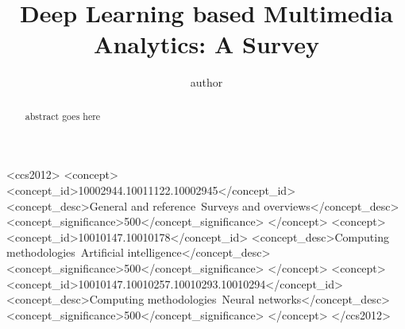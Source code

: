\documentclass[format=acmsmall, review=false, screen=true]{acmart}
\begin{document}
\title[Deep Learning based Multimedia Analytics]{Deep Learning based Multimedia Analytics: A Survey}


\author{author}


\begin{abstract}
abstract goes here
\end{abstract}


%
%
\begin{CCSXML}
	<ccs2012>
	<concept>
	<concept_id>10002944.10011122.10002945</concept_id>
	<concept_desc>General and reference~Surveys and overviews</concept_desc>
	<concept_significance>500</concept_significance>
	</concept>
	<concept>
	<concept_id>10010147.10010178</concept_id>
	<concept_desc>Computing methodologies~Artificial intelligence</concept_desc>
	<concept_significance>500</concept_significance>
	</concept>
	<concept>
	<concept_id>10010147.10010257.10010293.10010294</concept_id>
	<concept_desc>Computing methodologies~Neural networks</concept_desc>
	<concept_significance>500</concept_significance>
	</concept>
	</ccs2012>
\end{CCSXML}
\end{document}

